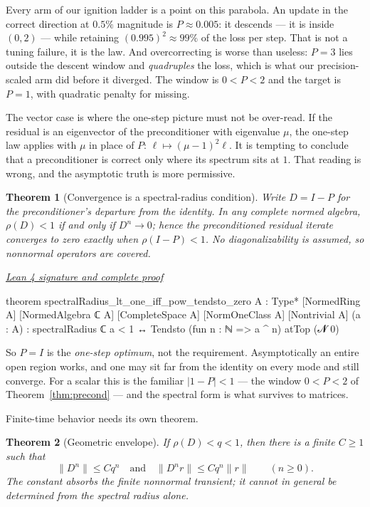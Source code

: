 \documentclass[11pt]{article}
\newtheorem{theorem}{Theorem}[section]
\newcommand{\leancommit}{647168959fc57cfe97526d9525d33e63681b8e2f}
\newcommand{\leansignaturelink}[2]{%
  \par\Needspace{0.3\textheight}\smallskip\noindent
  \href{https://github.com/zariuq/MeTTapedia/blob/\leancommit/#1\#L#2}{%
    \scriptsize\itshape Lean 4 signature and complete proof}\par\nobreak}
\begin{document}
Every arm of our ignition ladder is a point on this parabola. An update in the correct
direction at $0.5\%$ magnitude is $P \approx 0.005$: it descends --- it is inside
$(0,2)$ --- while retaining $(0.995)^2 \approx 99\%$ of the loss per step. That is not a
tuning failure, it is the law. And overcorrecting is worse than useless: $P = 3$ lies
outside the descent window and \emph{quadruples} the loss, which is what our
precision-scaled arm did before it diverged. The window is $0 < P < 2$ and the target is
$P = 1$, with quadratic penalty for missing.

The vector case is where the one-step picture must not be over-read. If the residual is
an eigenvector of the preconditioner with eigenvalue $\mu$, the one-step law applies with
$\mu$ in place of $P$: $\ell \mapsto (\mu-1)^2 \ell$. It is tempting to conclude that a
preconditioner is correct only where its spectrum sits at $1$. That reading is wrong, and
the asymptotic truth is more permissive.

\begin{theorem}[Convergence is a spectral-radius condition]\label{thm:spectral}
Write $D = I - P$ for the preconditioner's departure from the identity. In any complete
normed algebra, $\rho(D) < 1$ if and only if $D^n \to 0$; hence the preconditioned
residual iterate converges to zero exactly when $\rho(I-P) < 1$. No diagonalizability is
assumed, so nonnormal operators are covered.
\end{theorem}

\leansignaturelink{lean/mettapedia/Mettapedia/MachineLearning/NeuralNetworks/%
PredictiveCoding/OperatorStability.lean}{22}
\begin{leansignature}
theorem spectralRadius_lt_one_iff_pow_tendsto_zero
    {A : Type*} [NormedRing A] [NormedAlgebra ℂ A] [CompleteSpace A]
    [NormOneClass A] [Nontrivial A] (a : A) :
    spectralRadius ℂ a < 1 ↔
      Tendsto (fun n : ℕ => a ^ n) atTop (𝓝 0)
\end{leansignature}

So $P = I$ is the \emph{one-step optimum}, not the requirement. Asymptotically an entire
open region works, and one may sit far from the identity on every mode and still
converge. For a scalar this is the familiar $|1-P| < 1$ --- the window $0 < P < 2$ of
Theorem~\ref{thm:precond} --- and the spectral form is what survives to matrices.

Finite-time behavior needs its own theorem.

\begin{theorem}[Geometric envelope]\label{thm:envelope}
If $\rho(D)<q<1$, then there is a finite $C\geq1$ such that
\[
\|D^n\|\leq Cq^n\quad\text{and}\quad
\|D^nr\|\leq Cq^n\|r\|\qquad(n\geq0).
\]
The constant absorbs the finite nonnormal transient; it cannot in general be determined
from the spectral radius alone.
\end{theorem}
\end{document}
